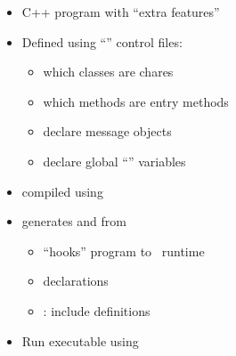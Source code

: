 \begin{frame}[fragile] 
\secframetitle{\ssCharm}

         

\begin{itemize}
\item C++ program with ``extra features''
\item Defined using ``'' control files: 
\begin{itemize}
\item which classes are chares
\item which methods are entry methods
\item declare message objects
\item declare global ``'' variables
\end{itemize}
\item compiled using 
\item generates  and  from 
\begin{itemize}
\item ``hooks'' program to \charm\ runtime
\item {} declarations
\item {}: include definitions
\end{itemize}
\item Run executable using 
\end{itemize}
\end{frame}

